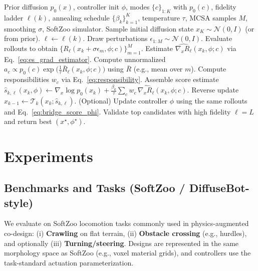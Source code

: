 \begin{algorithm}[t]
\caption{Mode-Robust Multi-Fidelity Model-Based Diffusion Co-Design (MR-MF-MBD)}
\label{alg:mrmfmbd}
\begin{algorithmic}[1]
\REQUIRE Prior diffusion $p_0(x)$, controller init $\phi$, modes $\{c\}_{1:K}$ with $p_0(c)$,
fidelity ladder $\ell(k)$, annealing schedule $\{\beta_k\}_{k=1}^K$, temperature $\tau$,
MCSA samples $M$, smoothing $\sigma$, SoftZoo simulator.
\STATE Sample initial diffusion state $x_K \sim \mathcal{N}(0,I)$ (or from prior).
    \STATE $\ell \leftarrow \ell(k)$.
    \STATE Draw perturbations $\epsilon_{1:M}\sim \mathcal{N}(0,I)$.
        \STATE Evaluate rollouts to obtain $\{R_\ell(x_k+\sigma\epsilon_m,\phi;c)\}_{m=1}^M$.
        \STATE Estimate $\widehat{\nabla_x R_\ell}(x_k,\phi;c)$ via Eq.~\eqref{eq:es_grad_estimator}.
        \STATE Compute unnormalized $a_c \propto p_0(c)\exp\big(\frac{1}{\tau}\bar R_\ell(x_k,\phi;c)\big)$
        using $\bar R$ (e.g., mean over $m$).
    \ENDFOR
    \STATE Compute responsibilities $w_c$ via Eq.~\eqref{eq:responsibility}.
    \STATE Assemble score estimate
    $\widehat{s}_{k,\ell}(x_k,\phi) \leftarrow \nabla_x\log p_0(x_k) + \frac{\beta_k}{\tau}\sum_c w_c\,\widehat{\nabla_x R_\ell}(x_k,\phi;c)$.
    \STATE Reverse update $x_{k-1}\leftarrow \mathcal{T}_k(x_k;\widehat{s}_{k,\ell})$.
    \STATE (Optional) Update controller $\phi$ using the same rollouts and Eq.~\eqref{eq:bridge_score_phi}.
\ENDFOR
\STATE Validate top candidates with high fidelity $\ell=L$ and return best $(x^\star,\phi^\star)$.
\end{algorithmic}
\end{algorithm}

\section{Experiments}
\label{sec:experiments}

\subsection{Benchmarks and Tasks (SoftZoo / DiffuseBot-style)}
\label{subsec:benchmarks}

We evaluate on SoftZoo locomotion tasks commonly used in physics-augmented co-design:
(i) \textbf{Crawling} on flat terrain,
(ii) \textbf{Obstacle crossing} (e.g., hurdles),
and optionally (iii) \textbf{Turning/steering}.
Designs are represented in the same morphology space as SoftZoo (e.g., voxel material grids),
and controllers use the task-standard actuation parameterization.

